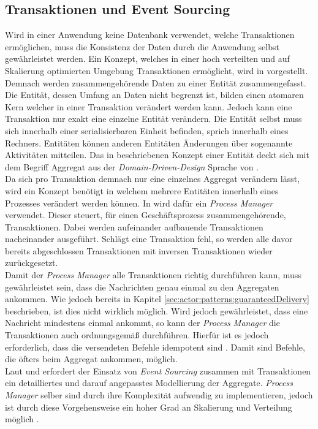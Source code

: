 \subsection{Transaktionen und Event Sourcing}
Wird in einer Anwendung keine Datenbank verwendet, welche Transaktionen ermöglichen, muss die Konsistenz der Daten durch die Anwendung selbst gewährleistet werden. Ein Konzept, welches in einer hoch verteilten und auf Skalierung optimierten Umgebung Transaktionen ermöglicht, wird in \cite{helland2007life} vorgestellt. Demnach werden zusammengehörende Daten zu einer Entität zusammengefasst. Die Entität, dessen Umfang an Daten nicht begrenzt ist, bilden einen atomaren Kern welcher in einer Transaktion verändert werden kann. Jedoch kann eine Transaktion nur exakt eine einzelne Entität verändern. Die Entität selbst muss sich innerhalb einer serialisierbaren Einheit befinden, sprich innerhalb eines Rechners. Entitäten können anderen Entitäten Änderungen über sogenannte Aktivitäten mitteilen. Das in \cite{helland2007life} beschriebenen Konzept einer Entität deckt sich mit dem Begriff Aggregat aus der \textit{Domain-Driven-Design} Sprache von \cite{Evans2004Domain-drivenSoftware}. \\
Da sich pro Transaktion demnach nur eine einzelnes Aggregat verändern lässt, wird ein Konzept benötigt in welchem mehrere Entitäten innerhalb eines Prozesses verändert werden können. In \cite{betts2013CQRSEventSourcing} wird dafür ein \textit{Process Manager} verwendet. Dieser steuert, für einen Geschäftsprozess zusammengehörende, Transaktionen. Dabei werden aufeinander aufbauende Transaktionen nacheinander ausgeführt. Schlägt eine Transaktion fehl, so werden alle davor bereits abgeschlossen Transaktionen mit inversen Transaktionen wieder zurückgesetzt. \\
Damit der \textit{Process Manager} alle Transaktionen richtig durchführen kann, muss gewährleistet sein, dass die Nachrichten genau einmal zu den Aggregaten ankommen. Wie jedoch bereits in Kapitel \ref{sec:actor:patterns:guaranteedDelivery} beschrieben, ist dies nicht wirklich möglich. Wird jedoch gewährleistet, dass eine Nachricht mindestens einmal ankommt, so kann der \textit{Process Manager} die Transaktionen auch ordnungsgemäß durchführen. Hierfür ist es jedoch erforderlich, dass die versendeten Befehle idempotent sind \citep{betts2013CQRSEventSourcing}. Damit sind Befehle, die öfters beim Aggregat ankommen, möglich. \\
Laut \cite{betts2013CQRSEventSourcing} und \cite{vernon2013implementing} erfordert der Einsatz von \textit{Event Sourcing} zusammen mit Transaktionen ein detailliertes und darauf angepasstes Modellierung der Aggregate. \textit{Process Manager} selber sind durch ihre Komplexität aufwendig zu implementieren, jedoch ist durch diese Vorgehensweise ein hoher Grad an Skalierung und Verteilung möglich \cite{helland2007life}.